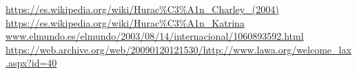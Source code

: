 \begin{thebibliography}{9}

  \url{https://es.wikipedia.org/wiki/Hurac%C3%A1n_Charley_(2004)}
  \url{https://es.wikipedia.org/wiki/Hurac%C3%A1n_Katrina}
  \url{www.elmundo.es/elmundo/2003/08/14/internacional/1060893592.html}
  \url{https://web.archive.org/web/20090120121530/http://www.lawa.org/welcome_lax.aspx?id=40}

\end{thebibliography}